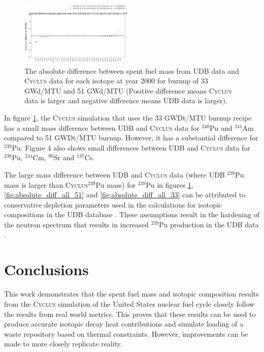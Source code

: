 \documentclass{anstrans}
\newcommand{\Cyclus}{\textsc{Cyclus}\xspace}%
\begin{document}
\begin{figure}[t] %
	\centering
	\includegraphics[width=0.48\textwidth]{figures/absolute_diff_2000}
	\caption{The absolute difference between spent fuel mass from UDB data and \Cyclus data for each isotope at year 2000 for burnup of 33 GWd/MTU and 51 GWd/MTU (Positive difference means \Cyclus data is larger and negative difference means UDB data is larger).}
	\label{fig:absolute_diff_2000}
\end{figure} 

In figure \ref{fig:absolute_diff_2000}, the \Cyclus simulation that uses the 33 
GWDt/MTU burnup recipe has a small mass difference between UDB and \Cyclus data 
for $^{240}$Pu and $^{241}$Am compared to 51 GWDt/MTU burnup. However, it has a 
substantial difference for $^{239}$Pu. Figure 4 also shows small differences 
between UDB and \Cyclus data for $^{238}$Pu, $^{244}$Cm, $^{90}$Sr and 
$^{137}$Cs. 

The large mass difference between UDB and \Cyclus data (where UDB $^{239}$Pu 
mass is larger than \Cyclus $^{239}$Pu mass) for $^{239}$Pu in figures 
\ref{fig:absolute_diff_2000}, \ref{fig:absolute_diff_all_51} and 
\ref{fig:absolute_diff_all_33} can be attributed to conservative depletion 
parameters used in the calculations for isotopic compositions in the UDB 
database \cite{peterson_additional_2017}. These assumptions result in the 
hardening of the neutron spectrum that results in increased $^{239}$Pu 
production in the UDB data \cite{peterson_additional_2017}. 

\section{Conclusions}
This work demonstrates that the spent fuel mass and isotopic composition 
results from the \Cyclus simulation of the United States nuclear fuel cycle 
closely follow the results from real world metrics. This proves that these 
results can be used to produce accurate isotopic decay heat contributions and 
simulate loading of a waste repository based on thermal constraints. However, 
improvements can be made to more closely replicate reality.  
\end{document}
